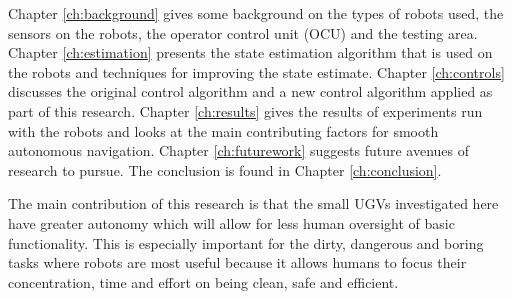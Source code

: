 Chapter \ref{ch:background} gives some background on the types of robots used, the sensors on the robots, the operator control unit (OCU) and the testing area. Chapter \ref{ch:estimation} presents the state estimation algorithm that is used on the robots and techniques for improving the state estimate. Chapter \ref{ch:controls} discusses the original control algorithm and a new control algorithm applied as part of this research. Chapter \ref{ch:results} gives the results of experiments run with the robots and looks at the main contributing factors for smooth autonomous navigation. Chapter \ref{ch:futurework} suggests future avenues of research to pursue. The conclusion is found in Chapter \ref{ch:conclusion}.

The main contribution of this research is that the small UGVs investigated here have greater autonomy which will allow for less human oversight of basic functionality. This is especially important for the dirty, dangerous and boring tasks where robots are most useful because it allows humans to focus their concentration, time and effort on being clean, safe and efficient.
